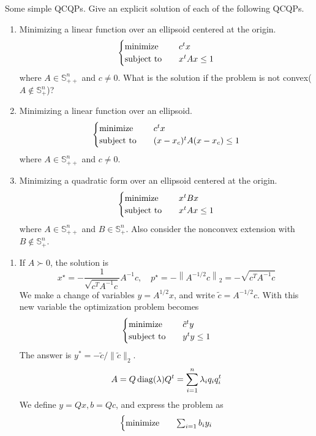 \begin{problem}[4.21]
    Some simple QCQPs. Give an explicit solution of each of the following QCQPs.
    \begin{enumerate}
        \item Minimizing a linear function over an ellipsoid centered at the origin.\[\begin{cases}
            \operatorname{minimize} \quad &c^tx\\
            \operatorname{subject\ to} \quad &x^tAx \le 1
        \end{cases}\]
        where $A \in \mathbb{S}_{++}^n$ and $c \neq 0$. What is the solution if the problem is not convex($A \notin \mathbb{S}_+^n$)?
        \item Minimizing a linear function over an ellipsoid.\[\begin{cases}
            \operatorname{minimize} \quad &c^tx \\
            \operatorname{subject\ to} \quad &(x - x_c)^t A (x - x_c) \le 1
        \end{cases}\] where $A \in \mathbb{S}_{++}^n$ and $c \neq 0$.
        \item Minimizing a quadratic form over an ellipsoid centered at the origin. \[\begin{cases}
            \operatorname{minimize} \quad &x^tBx \\
            \operatorname{subject\ to} \quad &x^tAx \le 1
        \end{cases}\] where $A \in \mathbb{S}_{++}^n$ and $B \in \mathbb{S}_+^n$. Also consider the nonconvex extension with $B \notin \mathbb{S}_+^n$.
    \end{enumerate}
    \Answer \text{}\begin{enumerate}
        \item If $A \succ 0$, the solution is \[x^{\star}=-\frac{1}{\sqrt{c^{T} A^{-1} c}} A^{-1} c, \quad p^{\star}=-\left\|A^{-1 / 2} c\right\|_{2}=-\sqrt{c^{T} A^{-1} c}\]
        We make a change of variables $y = A^{1 / 2}x$, and write $\tilde{c} = A^{-1 / 2}c$. With this new variable the optimization problem becomes\[\begin{cases}
            \operatorname{minimize} \quad &\tilde{c}^ty\\
            \operatorname{subject\ to} \quad &y^ty \le 1
        \end{cases}\]The answer is $y^* = -\tilde{c} / \|\tilde{c}\|_2$. \[A = Q\operatorname{diag}(\lambda)Q^t = \sum_{i = 1}^n\lambda_iq_iq_i^t\]
        We define $y = Qx, b = Qc$, and express the problem as \[\begin{cases}
            \operatorname{minimize} \quad &\sum_{i = 1}b_iy_i\\

\end{cases}\]
\end{enumerate}
\end{problem}
